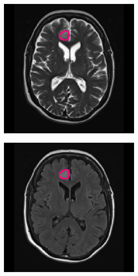 \begin{subappendices}
\begin{figure}[htbp]
\begin{subfigure}[b]{0.8\textwidth}
\begin{subfigure}[b]{0.215\textwidth}
        \end{subfigure}
        \hfill
        \begin{subfigure}[b]{0.215\textwidth}
        \includegraphics[width=\textwidth, clip, trim=2.5cm 0.5cm 2.5cm 0.5cm]{Figures/Random_segs/T2_TCGA-FG-A713.png}
        \end{subfigure}
        \hfill
        \begin{subfigure}[b]{0.215\textwidth}
        \includegraphics[width=\textwidth, clip, trim=2.5cm 0.5cm 2.5cm 0.5cm]{Figures/Random_segs/FLAIR_TCGA-FG-A713.png}

\end{subfigure}
\end{subfigure}
\end{figure}
\end{subappendices}
